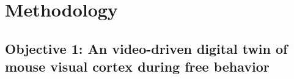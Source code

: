 \documentclass[B2,COG]{ercgrant}
\begin{document}
\section{Methodology}
\subsection{Objective 1: An video-driven digital twin of mouse visual cortex during free behavior}
\end{document}
